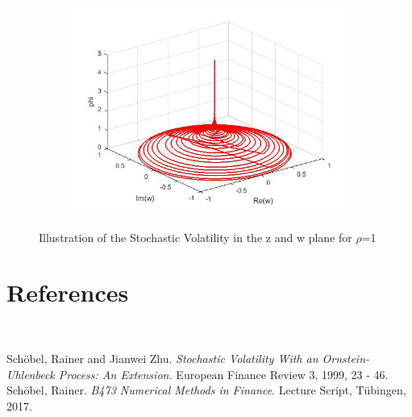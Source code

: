 \documentclass[a4paper,11pt]{article}
\begin{document}
\begin{figure}[!h]
\begin{subfigure}[c]{0.5\textwidth}
\includegraphics[width=\linewidth]{36.jpg}
\end{subfigure}
\caption{Illustration of the Stochastic Volatility in the z and w plane for $\rho$=1}
\label{w4}
\end{figure}
\newpage
\section{References}
\

Sch\"obel, Rainer and Jianwei Zhu. \textit{Stochastic Volatility With an Ornstein-Uhlenbeck Process: An Extension.} European Finance Review 3, 1999, 23 - 46.
\\

Sch\"obel, Rainer. \textit{B473 Numerical Methods in Finance}. Lecture Script, T\"ubingen, 2017.
\end{document}
